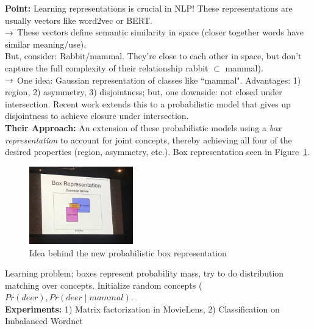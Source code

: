 {\bf Point:} Learning representations is crucial in NLP! These representations are usually vectors like word2vec or BERT. \\

$\rightarrow$ These vectors define semantic similarity in space (closer together words have similar meaning/use). \\

But, consider: Rabbit/mammal. They're close to each other in space, but don't capture the full complexity of their relationship rabbit $\subset$ mammal). \\

$\rightarrow$ One idea: Gaussian representation of classes like ``mammal". Advantages: 1) region, 2) asymmetry, 3) disjointness; but, one downside: not closed under intersection. Recent work extends this to a probabilistic model that gives up disjointness to achieve closure under intersection. \\

{\bf Their Approach:} An extension of these probabilistic models using a {\it box representation} to account for joint concepts, thereby achieving all four of the desired properties (region, asymmetry, etc.). Box representation seen in Figure~\ref{fig:box}. \\

\begin{figure}[h!]
    \centering
    \includegraphics[width=0.4\textwidth]{images/box.JPG}
    \caption{Idea behind the new probabilistic box representation}
    \label{fig:box}
\end{figure}

Learning problem; boxes represent probability mass, try to do distribution matching over concepts. Initialize random concepts ($Pr(deer), Pr(deer \mid mammal)$. \\

{\bf Experiments:} 1) Matrix factorization in MovieLens, 2) Classification on Imbalanced Wordnet

